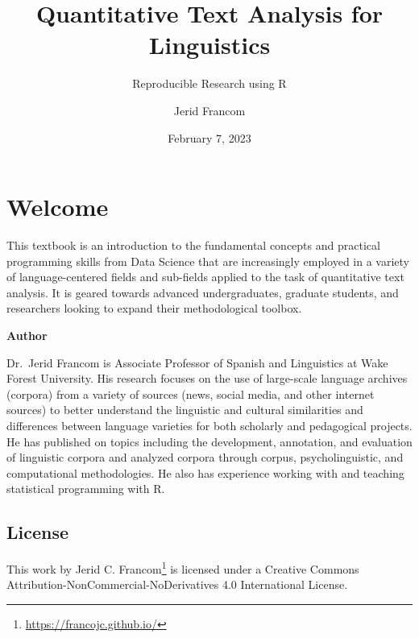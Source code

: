 \documentclass[
  letterpaper,
]{scrbook}
\title{Quantitative Text Analysis for Linguistics}
\subtitle{Reproducible Research using R}
\author{Jerid Francom}
\date{February 7, 2023}
\renewcommand*\contentsname{Table of contents}
\newcommand\contentsname{Table of contents}
\DeclareRobustCommand{\href}[2]{#2\footnote{\url{#1}}}
\begin{document}
\frontmatter
\maketitle
\ifdefined\Shaded\renewenvironment{Shaded}{\begin{tcolorbox}[boxrule=0pt, colback={shadecolor}, enhanced, breakable, frame hidden]}{\end{tcolorbox}}\fi

\renewcommand*\contentsname{Table of contents}
{
\setcounter{tocdepth}{2}
\tableofcontents
}
\mainmatter
{}

\hypertarget{welcome}{%
\chapter*{Welcome}\label{welcome}}


This textbook is an introduction to the fundamental concepts and
practical programming skills from Data Science that are increasingly
employed in a variety of language-centered fields and sub-fields applied
to the task of quantitative text analysis. It is geared towards advanced
undergraduates, graduate students, and researchers looking to expand
their methodological toolbox.

\textbf{Author}

Dr.~Jerid Francom is Associate Professor of Spanish and Linguistics at
Wake Forest University. His research focuses on the use of large-scale
language archives (corpora) from a variety of sources (news, social
media, and other internet sources) to better understand the linguistic
and cultural similarities and differences between language varieties for
both scholarly and pedagogical projects. He has published on topics
including the development, annotation, and evaluation of linguistic
corpora and analyzed corpora through corpus, psycholinguistic, and
computational methodologies. He also has experience working with and
teaching statistical programming with R.

\hypertarget{license}{%
\section*{License}\label{license}}


This work by \href{https://francojc.github.io/}{Jerid C. Francom} is
licensed under a Creative Commons
Attribution-NonCommercial-NoDerivatives 4.0 International License.
\end{document}
